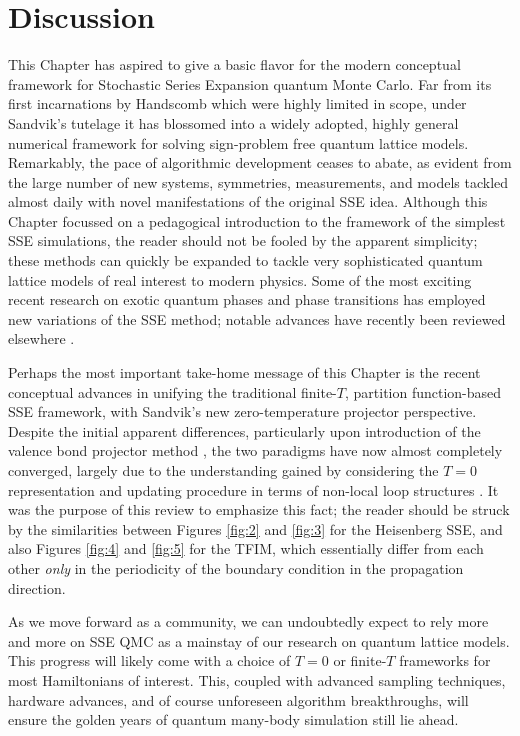 \documentclass[vecphys]{svmult}
\begin{document}
\section{Discussion}

This Chapter has aspired to give a basic flavor for the modern conceptual framework for Stochastic Series Expansion quantum Monte Carlo.  Far from its first incarnations by Handscomb which were highly limited in scope, under Sandvik's tutelage it has blossomed into
a widely adopted, highly general numerical framework for solving sign-problem free quantum lattice models.  Remarkably, the pace of algorithmic development ceases to abate, as evident from the large number of new systems, symmetries, measurements, and models tackled almost daily with novel manifestations of the original SSE idea.  Although this Chapter focussed on a pedagogical introduction to the framework of the simplest SSE simulations, the reader should not be fooled by the apparent simplicity;
these methods can quickly be expanded to tackle very sophisticated quantum lattice models of real interest to modern physics.  Some of the most exciting recent research on exotic quantum phases and phase transitions has employed new variations of the SSE method; notable advances have recently been reviewed elsewhere \cite{Melko:Designer}.

Perhaps the most important take-home message of this Chapter is the recent conceptual advances in unifying the traditional finite-$T$, partition function-based SSE framework, with Sandvik's new zero-temperature projector perspective.  Despite the initial apparent differences, particularly upon introduction of the valence bond projector method \cite{Melko:Sandvik05}, the two paradigms have now almost completely converged, largely due to the understanding gained by considering the $T=0$ representation and updating procedure in terms of non-local loop structures \cite{Melko:Sandvik10a}.  It was the purpose of this review to emphasize this fact; the reader should be struck by the similarities between Figures \ref{fig:2} and \ref{fig:3} for the Heisenberg SSE, and also Figures \ref{fig:4} and \ref{fig:5} for the TFIM, which essentially differ from each other {\em only} in the periodicity of the boundary condition in the propagation direction.

As we move forward as a community, we can undoubtedly expect to rely more and more on SSE QMC as a mainstay of our research on quantum lattice models.   This progress will likely come with a choice of $T=0$ or finite-$T$ frameworks for most Hamiltonians of interest.  This, coupled with advanced sampling techniques, hardware advances, and of course unforeseen algorithm breakthroughs, will ensure the golden years of quantum many-body simulation still lie ahead.
\end{document}
